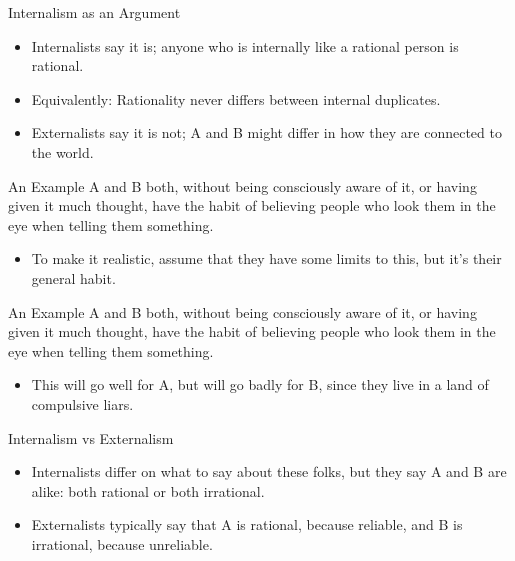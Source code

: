 \documentclass[
  17pt,
  letterpaper,
  ignorenonframetext,
  aspectratio=169,
  handout]{beamer}
\providecommand{\tightlist}{%
  \setlength{\itemsep}{0pt}\setlength{\parskip}{0pt}}\usepackage{longtable,booktabs,array}
\begin{document}
\begin{frame}{Internalism as an Argument}
\protect\hypertarget{internalism-as-an-argument-1}{}
\begin{itemize}[<+->]
\tightlist
\item
  Internalists say it is; anyone who is internally like a rational
  person is rational.
\item
  Equivalently: Rationality never differs between internal duplicates.
\item
  Externalists say it is not; A and B might differ in how they are
  connected to the world.
\end{itemize}
\end{frame}

\begin{frame}{An Example}
\protect\hypertarget{an-example}{}
A and B both, without being consciously aware of it, or having given it
much thought, have the habit of believing people who look them in the
eye when telling them something.

\begin{itemize}[<+->]
\tightlist
\item
  To make it realistic, assume that they have some limits to this, but
  it's their general habit.
\end{itemize}
\end{frame}

\begin{frame}{An Example}
\protect\hypertarget{an-example-1}{}
A and B both, without being consciously aware of it, or having given it
much thought, have the habit of believing people who look them in the
eye when telling them something.

\begin{itemize}[<+->]
\tightlist
\item
  This will go well for A, but will go badly for B, since they live in a
  land of compulsive liars.
\end{itemize}
\end{frame}

\begin{frame}{Internalism vs Externalism}
\protect\hypertarget{internalism-vs-externalism}{}
\begin{itemize}[<+->]
\tightlist
\item
  Internalists differ on what to say about these folks, but they say A
  and B are alike: both rational or both irrational.
\item
  Externalists typically say that A is rational, because reliable, and B
  is irrational, because unreliable.
\end{itemize}
\end{frame}
\end{document}
